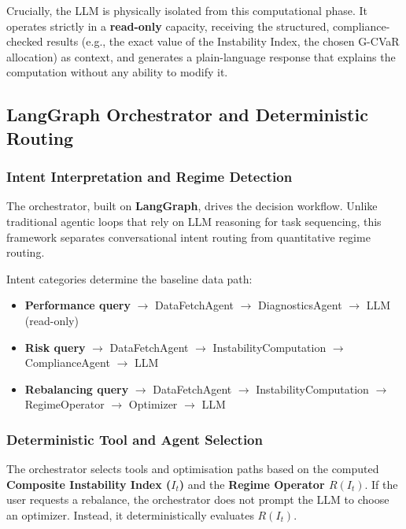 \documentclass[11pt]{article}
\begin{document}
Crucially, the LLM is physically isolated from this computational phase. It operates strictly in a \textbf{read-only} capacity, receiving the structured, compliance-checked results (e.g., the exact value of the Instability Index, the chosen G-CVaR allocation) as context, and generates a plain-language response that explains the computation without any ability to modify it.

\subsection{LangGraph Orchestrator and Deterministic Routing}
\label{sec:planner}

\subsubsection{Intent Interpretation and Regime Detection}

The orchestrator, built on \textbf{LangGraph}, drives the decision workflow. Unlike traditional agentic loops that rely on LLM reasoning for task sequencing, this framework separates conversational intent routing from quantitative regime routing.

Intent categories determine the baseline data path:
\begin{itemize}
  \item \textbf{Performance query} $\to$ DataFetchAgent $\to$ DiagnosticsAgent $\to$ LLM (read-only)
  \item \textbf{Risk query} $\to$ DataFetchAgent $\to$ InstabilityComputation $\to$ ComplianceAgent $\to$ LLM
  \item \textbf{Rebalancing query} $\to$ DataFetchAgent $\to$ InstabilityComputation $\to$ RegimeOperator $\to$ Optimizer $\to$ LLM
\end{itemize}

\subsubsection{Deterministic Tool and Agent Selection}

The orchestrator selects tools and optimisation paths based on the computed \textbf{Composite Instability Index ($I_t$)} and the \textbf{Regime Operator $R(I_t)$}. If the user requests a rebalance, the orchestrator does not prompt the LLM to choose an optimizer. Instead, it deterministically evaluates $R(I_t)$.
\end{document}
